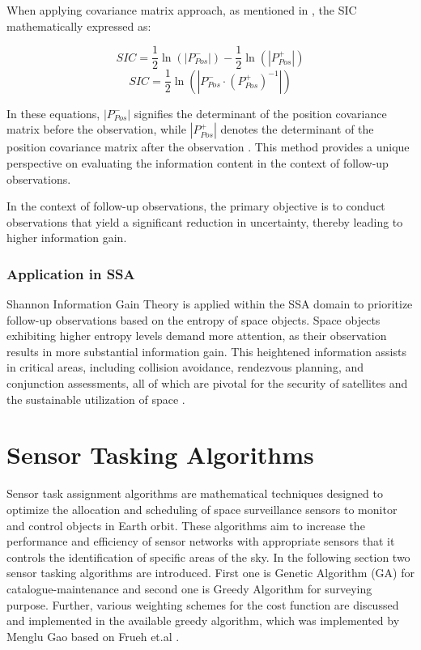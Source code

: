 When applying covariance matrix approach, as mentioned in \cite{hinze1}, the SIC mathematically expressed as:

\begin{equation}
  SIC=\frac{1}{2}\ln(|P^-_{Pos}|)-\frac{1}{2}\ln(|P^+_{Pos}|)
\end{equation}
\begin{equation}
  SIC=\frac{1}{2}\ln(|P^-_{Pos}\cdot(P^+_{Pos})^{-1}|)
\end{equation}

In these equations, $|P^-_{Pos}|$ signifies the determinant of the position covariance matrix before the observation, 
while $|P^+_{Pos}|$ denotes the determinant of the position covariance matrix after the observation \cite{hinze1}. This method provides 
a unique perspective on evaluating the information content in the context of follow-up observations.

In the context of follow-up observations, the primary objective is to conduct observations that yield a significant reduction in uncertainty, thereby leading to higher information gain.

\subsubsection{Application in SSA}
Shannon Information Gain Theory is applied within the SSA domain to prioritize follow-up observations based on the entropy of space objects. Space objects exhibiting higher entropy levels 
demand more attention, as their observation results in more substantial information gain. This heightened information assists in critical areas, including collision avoidance, rendezvous planning, 
and conjunction assessments, all of which are pivotal for the security of satellites and the sustainable utilization of space \cite{hinze1}.

\section{Sensor Tasking Algorithms}
Sensor task assignment algorithms are mathematical techniques designed to optimize the allocation and scheduling of space surveillance sensors to monitor and control objects in Earth orbit. These algorithms aim to increase the performance and efficiency of sensor networks with appropriate sensors that it controls the identification of specific areas of the sky. In the following section two sensor tasking algorithms are introduced. First one is Genetic Algorithm (GA) for catalogue-maintenance and second one is Greedy Algorithm for surveying purpose.
Further, various weighting schemes for the cost function are discussed and implemented in the available greedy algorithm, which was implemented by Menglu Gao \cite{gao} based on Frueh et.al \cite{fruh1}.

